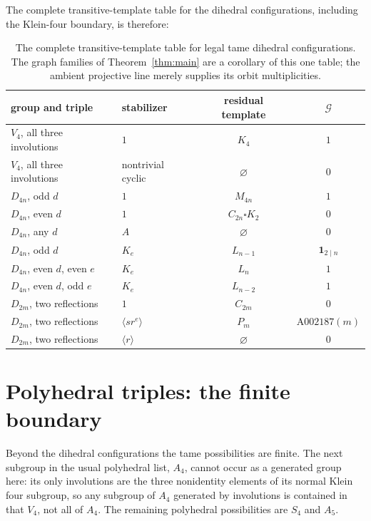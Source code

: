 \documentclass[11pt]{article}
\theoremstyle{definition}
\theoremstyle{remark}
\newcommand{\Grundy}{\mathcal{G}}
\newcommand{\Cyc}{C}
\newcommand{\Mob}{M}
\begin{document}
The complete transitive-template table for the dihedral configurations, including the Klein-four
boundary, is therefore:

\begin{table}[H]
\centering
\begin{tabular}{llcc}
\toprule
group and triple & stabilizer & residual template & $\Grundy$\\
\midrule
$V_4$, all three involutions & $1$ & $K_4$ & $1$\\
$V_4$, all three involutions & nontrivial cyclic & $\varnothing$ & $0$\\
$D_{4n}$, odd $d$ & $1$ & $\Mob_{4n}$ & $1$\\
$D_{4n}$, even $d$ & $1$ & $\Cyc_{2n}\square K_2$ & $0$\\
$D_{4n}$, any $d$ & $A$ & $\varnothing$ & $0$\\
$D_{4n}$, odd $d$ & $K_e$ & $L_{n-1}$ & $\mathbf 1_{2\mid n}$\\
$D_{4n}$, even $d$, even $e$ & $K_e$ & $L_n$ & $1$\\
$D_{4n}$, even $d$, odd $e$ & $K_e$ & $L_{n-2}$ & $1$\\
\midrule
$D_{2m}$, two reflections & $1$ & $\Cyc_{2m}$ & $0$\\
$D_{2m}$, two reflections & $\langle sr^e\rangle$ & $P_m$ & $\mathrm{A}002187(m)$\\
$D_{2m}$, two reflections & $\langle r\rangle$ & $\varnothing$ & $0$\\
\bottomrule
\end{tabular}
\caption{The complete transitive-template table for legal tame dihedral configurations. The graph
families of Theorem~\ref{thm:main} are a corollary of this one table; the ambient projective line
merely supplies its orbit multiplicities.}
\label{tab:templates}
\end{table}

\section{Polyhedral triples: the finite boundary}
\label{sec:polyhedral}

Beyond the dihedral configurations the tame possibilities are finite. The next subgroup in the usual
polyhedral list, $A_4$, cannot occur as a generated group here: its only involutions are the three
nonidentity elements of its normal Klein four subgroup, so any subgroup of $A_4$ generated by
involutions is contained in that $V_4$, not all of $A_4$. The remaining polyhedral possibilities are
$S_4$ and $A_5$.
\end{document}
